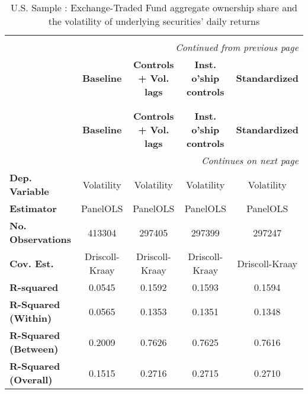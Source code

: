 {\small
\begin{center}
\begin{longtable}{lcccc}
\linespread{1.0}\\
\multicolumn{5}{r}{\textit{Continued from previous page}}\\
\toprule
& \textbf{Baseline}  & \textbf{Controls + Vol. lags} & \textbf{Inst. o'ship controls} & \textbf{Standardized}  \\
\midrule
\endhead
\caption{U.S. Sample : Exchange-Traded Fund aggregate ownership share and the volatility of underlying securities' daily returns}\\
\label{tab:Volatility:US:Comp}\\
\toprule
& \textbf{Baseline}  & \textbf{Controls + Vol. lags} & \textbf{Inst. o'ship controls} & \textbf{Standardized}  \\
\midrule
\endfirsthead
\bottomrule
\multicolumn{5}{r}{\textit{Continues on next page}}\\
\endfoot
\bottomrule
\endlastfoot
\textbf{Dep. Variable}                     &     Volatility     &           Volatility          &           Volatility           &       Volatility       \\
\textbf{Estimator}                         &      PanelOLS      &            PanelOLS           &            PanelOLS            &        PanelOLS        \\
\textbf{No. Observations}                  &       413304       &             297405            &             297399             &         297247         \\
\textbf{Cov. Est.}                         &   Driscoll-Kraay   &         Driscoll-Kraay        &         Driscoll-Kraay         &     Driscoll-Kraay     \\
\textbf{R-squared}                         &       0.0545       &             0.1592            &             0.1593             &         0.1594         \\
\textbf{R-Squared (Within)}                &       0.0565       &             0.1353            &             0.1351             &         0.1348         \\
\textbf{R-Squared (Between)}               &       0.2009       &             0.7626            &             0.7625             &         0.7616         \\
\textbf{R-Squared (Overall)}               &       0.1515       &             0.2716            &             0.2715             &         0.2710         \\

\end{longtable}
\end{center}}
